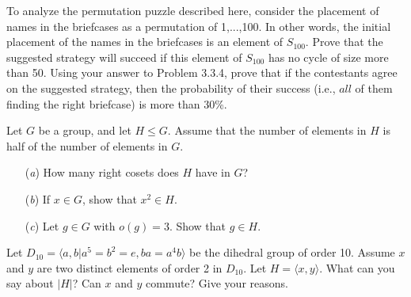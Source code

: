 \documentclass[12pt,letterpaper,boxed]{hmcpset}
\begin{document}

\begin{problem}[3.3.5]
To analyze the permutation puzzle described here, consider the placement of names in the briefcases as a permutation of 1,...,100. In other words, the initial placement of the names in the briefcases is an element of $S_{100}$. Prove that the suggested strategy will succeed if this element of $S_{100}$ has no cycle of size more than 50. Using your answer to Problem 3.3.4, prove that if the contestants agree on the suggested strategy, then the probability of their success (i.e., $\textit{all}$ of them finding the right briefcase) is more than 30\%. 
\end{problem}

\begin{solution}

\end{solution}

\clearpage

\begin{problem}[5.1.17]
Let $ G $ be a group, and let $ H \leq G $. Assume that the number of elements in $H$ is half of the number of elements in $G$. 
\begin{itemize}
  \item[(\textit{a})] How many right cosets does $H$ have in $G$?
  
  \item[(\textit{b})] If $x \in G$, show that $x^2 \in H$. 
  
  \item[(\textit{c})] Let $g \in G$ with $o(g) = 3$. Show that $g \in H$.
\end{itemize}
\end{problem}

\begin{solution}
\end{solution}

\clearpage

\begin{problem}[5.2.5]
Let $D_{10} = \langle a,b \vert a^5 = b^2 = e, ba = a^4b \rangle$ be the dihedral group of order 10. Assume $x$ and $y$ are two distinct elements of order 2 in $D_{10}$. Let $H = \langle x,y \rangle$. What can you say about $\vert H \vert$? Can $x$ and $y$ commute? Give your reasons. 
\end{problem}

\begin{solution}
\end{solution}
\end{document}
